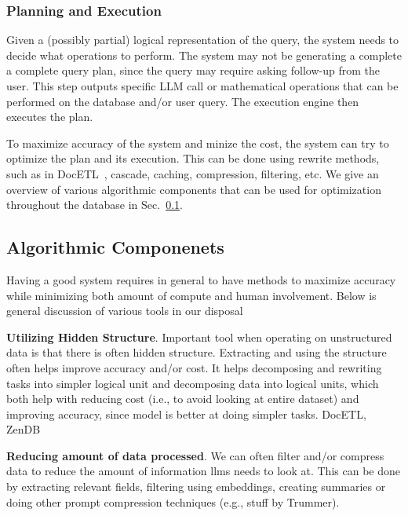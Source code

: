 \subsubsection{Planning and Execution}
Given a (possibly partial) logical representation of the query, the system needs to decide what operations to perform. The system may not be generating a complete a complete query plan, since the query may require asking follow-up from the user. This step outputs specific LLM call or mathematical operations that can be performed on the database and/or user query. The execution engine then executes the plan. 

To maximize accuracy of the system and minize the cost, the system can try to optimize the plan and its execution.  This can be done using rewrite methods, such as in DocETL~\cite{shankar2024docetl}, cascade, caching, compression, filtering, etc. We give an overview of various algorithmic components that can be used for optimization throughout the database in Sec.~\ref{sec:alg_opt}. 





\subsection{Algorithmic Componenets}\label{sec:alg_opt}
Having a good system requires in general to have methods to maximize accuracy while minimizing both amount of compute and human involvement. Below is general discussion of various tools in our disposal 

\textbf{Utilizing Hidden Structure}. Important tool when operating on unstructured data is that there is often hidden structure. Extracting and using the structure often helps improve accuracy and/or cost. It helps decomposing and rewriting tasks into simpler logical unit and decomposing data into logical units, which both help with reducing cost (i.e., to avoid looking at entire dataset) and improving accuracy, since model is better at doing simpler tasks. DocETL, ZenDB

\textbf{Reducing amount of data processed}. We can often filter and/or compress data to reduce the amount of information llms needs to look at. This can be done by extracting relevant fields, filtering using embeddings, creating summaries or doing other prompt compression techniques (e.g., stuff by Trummer). 


